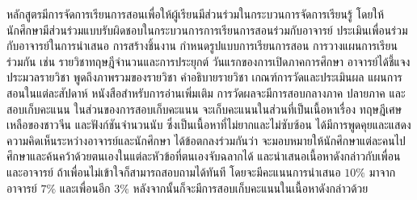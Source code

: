 หลักสูตรมีการจัดการเรียนการสอนเพื่อให้ผู้เรียนมีส่วนร่วมในกระบวนการจัดการเรียนรู้ โดยให้นักศึกษามีส่วนร่วมแบบรับผิดชอบในกระบวนการการเรียนการสอนร่วมกับอาจารย์  ประเมินเพื่อนร่วมกับอาจารย์ในการนำเสนอ การสร้างชิ้นงาน กำหนดรูปแบบการเรียนการสอน การวางแผนการเรียนร่วมกัน เช่น รายวิชาทฤษฎีจำนวนและการประยุกต์
วันแรกของการเปิดภาคการศึกษา อาจารย์ได้ชี้แจงประมวลรายวิชา พูดถึงภาพรวมของรายวิชา คำอธิบายรายวิชา เกณฑ์การวัดและประเมินผล แผนการสอนในแต่ละสัปดาห์ หนังสือสำหรับการอ่านเพิ่มเติม  
การวัดผลจะมีการสอบกลางภาค ปลายภาค และสอบเก็บคะแนน  ในส่วนของการสอบเก็บคะแนน จะเก็บคะแนนในส่วนที่เป็นเนื้อหาเรื่อง ทฤษฎีเศษเหลือของชาวจีน และฟังก์ชันจำนวนนับ ซึ่งเป็นเนื้อหาที่ไม่ยากและไม่ซับซ้อน  ได้มีการพูดคุยและแสดงความคิดเห็นระหว่างอาจารย์และนักศึกษา  ได้ข้อตกลงร่วมกันว่า  จะมอบหมายให้นักศึกษาแต่ละคนไปศึกษาและค้นคว้าด้วยตนเองในแต่ละหัวข้อที่ตนเองจับฉลากได้ และนำเสนอเนื้อหาดังกล่าวกับเพื่อนและอาจารย์ ถ้าเพื่อนไม่เข้าใจก็สามารถสอบถามได้ทันที โดยจะมีคะแนนการนำเสนอ $10\%$ มาจากอาจารย์ $7\%$ และเพื่อนอีก $3\%$ หลังจากนั้นก็จะมีการสอบเก็บคะแนนในเนื้อหาดังกล่าวด้วย  


\begin{doclist}
\end{doclist}



